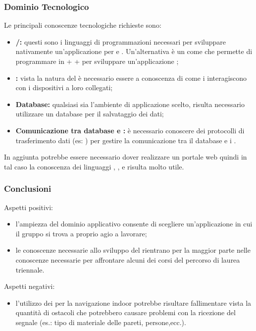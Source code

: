 \subsubsection{Dominio Tecnologico}
Le principali conoscenze tecnologiche richieste sono:

\begin{itemize}
	\item \textbf{/:} questi sono i linguaggi di programmazioni necessari per sviluppare nativamente un'applicazione per  e . Un'alternativa è un  come  che 
	permette di programmare in  +  +  per sviluppare un'applicazione ;
	\item \textbf{:} vista la natura del  è necessario essere a conoscenza di come i  interagiscono con i dispositivi a loro collegati;
	\item \textbf{Database:} qualsiasi sia l'ambiente di applicazione scelto, risulta necessario utilizzare un database per il salvataggio dei dati;
	\item \textbf{Comunicazione tra database e :} è necessario conoscere dei protocolli di trasferimento dati (es: ) per gestire la comunicazione tra il database e i .
\end{itemize}

In aggiunta potrebbe essere necessario dover realizzare un portale web quindi in tal caso la conoscenza dei linguaggi , ,  e  risulta molto utile.


\subsubsection{Conclusioni}

Aspetti positivi:

\begin{itemize}
	\item l'ampiezza del dominio applicativo consente di scegliere un'applicazione in cui il gruppo si trova a proprio agio a lavorare;
	\item le conoscenze necessarie allo sviluppo del  rientrano per la maggior parte nelle conoscenze necessarie per affrontare alcuni dei corsi del percorso di laurea triennale.
\end{itemize}

Aspetti negativi:

\begin{itemize}
	\item l'utilizzo dei  per la navigazione indoor potrebbe risultare fallimentare vista la quantità di ostacoli che potrebbero causare problemi con la ricezione del segnale (es.: tipo di materiale delle pareti, persone,ecc.).
\end{itemize}
